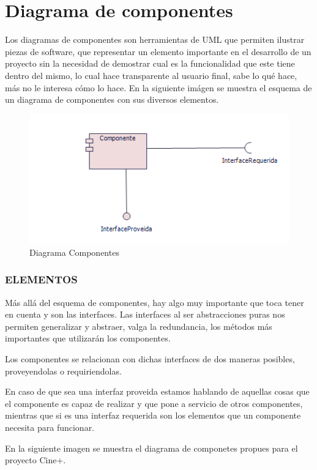 \chapter{Diagrama de componentes}	
	Los diagramas de componentes son herramientas de UML que permiten ilustrar piezas de software, que representar un elemento importante en el desarrollo de un proyecto sin la necesidad de demostrar cual es la funcionalidad que este tiene dentro del mismo, lo cual hace transparente al usuario final, sabe lo qué hace, más no le interesa cómo lo hace. En la siguiente imágen se muestra el esquema de un diagrama de componentes con sus diversos elementos.
	
\begin{figure}[h!]
	\centering
	\includegraphics[scale=0.8]{diseno/componentes/imgs/comp}
	\caption{Diagrama Componentes}
\end{figure}

\subsection{ELEMENTOS}
Más allá del esquema de componentes, hay algo muy importante que toca tener en cuenta y son las interfaces. Las interfaces al ser abstracciones puras nos permiten generalizar y abstraer, valga la redundancia, los métodos más importantes que utilizarán los componentes. 

Los componentes se relacionan con dichas interfaces de dos maneras posibles, proveyendolas o requiriendolas.

En caso de que sea una interfaz  proveida estamos hablando de aquellas cosas que el componente es capaz de realizar y que pone a servicio de otros componentes, mientras que si es una interfaz requerida son los elementos que un componente necesita para funcionar.

En la siguiente imagen se muestra el diagrama de componetes propues para el proyecto Cine+.